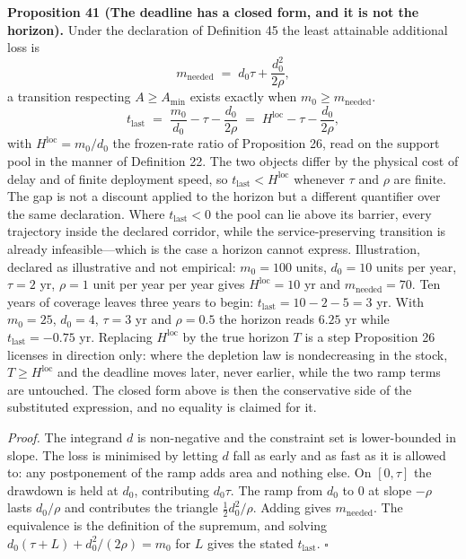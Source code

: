 \documentclass[11pt]{article}
\begin{document}
\textbf{Proposition 41 (The deadline has a closed form, and it is not the horizon).} Under the declaration of Definition 45 the least attainable additional loss is \[ m_{\mathrm{needed}} \;=\; d_0\tau + \frac{d_0^{2}}{2\rho} , \] a transition respecting \(A \ge A_{\min}\) exists exactly when \(m_0 \ge m_{\mathrm{needed}}\). \[ t_{\mathrm{last}} \;=\; \frac{m_0}{d_0} - \tau - \frac{d_0}{2\rho} \;=\; H^{\mathrm{loc}} - \tau - \frac{d_0}{2\rho} , \] with \(H^{\mathrm{loc}} = m_0/\allowbreak{}d_0\) the frozen-rate ratio of Proposition 26, read on the support pool in the manner of Definition 22. The two objects differ by the physical cost of delay and of finite deployment speed, so \(t_{\mathrm{last}} < H^{\mathrm{loc}}\) whenever \(\tau\) and \(\rho\) are finite. The gap is not a discount applied to the horizon but a different quantifier over the same declaration. Where \(t_{\mathrm{last}} < 0\) the pool can lie above its barrier, every trajectory inside the declared corridor, while the service-preserving transition is already infeasible---which is the case a horizon cannot express. Illustration, declared as illustrative and not empirical: \(m_0 = 100\) units, \(d_0 = 10\) units per year, \(\tau = 2\) yr, \(\rho = 1\) unit per year per year gives \(H^{\mathrm{loc}} = 10\) yr and \(m_{\mathrm{needed}} = 70\). Ten years of coverage leaves three years to begin: \(t_{\mathrm{last}} = 10 - 2 - 5 = 3\) yr. With \(m_0 = 25\), \(d_0 = 4\), \(\tau = 3\) yr and \(\rho = 0.5\) the horizon reads \(6.25\) yr while \(t_{\mathrm{last}} = -0.75\) yr. Replacing \(H^{\mathrm{loc}}\) by the true horizon \(T\) is a step Proposition 26 licenses in direction only: where the depletion law is nondecreasing in the stock, \(T \ge H^{\mathrm{loc}}\) and the deadline moves later, never earlier, while the two ramp terms are untouched. The closed form above is then the conservative side of the substituted expression, and no equality is claimed for it.

\emph{Proof.} The integrand \(d\) is non-negative and the constraint set is lower-bounded in slope. The loss is minimised by letting \(d\) fall as early and as fast as it is allowed to: any postponement of the ramp adds area and nothing else. On \([0, \tau]\) the drawdown is held at \(d_0\), contributing \(d_0 \tau\). The ramp from \(d_0\) to \(0\) at slope \(-\rho\) lasts \(d_0/\rho\) and contributes the triangle \(\tfrac{1}{2} d_0^{2}/\rho\). Adding gives \(m_{\mathrm{needed}}\). The equivalence is the definition of the supremum, and solving \(d_0(\tau + L) + d_0^2/(2\rho) = m_0\) for \(L\) gives the stated \(t_{\mathrm{last}}\). \ensuremath{\square}
\end{document}
